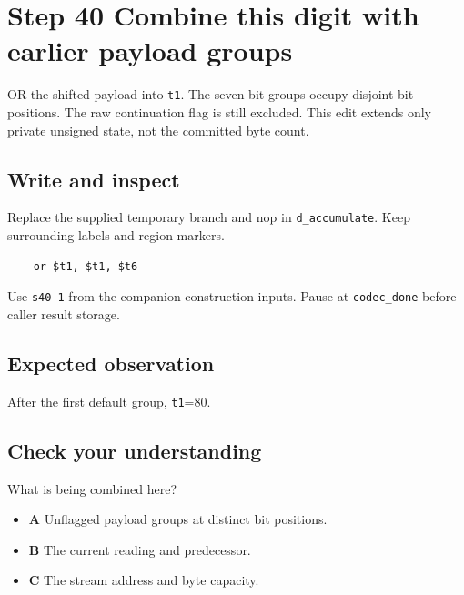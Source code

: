 \section{Step 40 Combine this digit with earlier payload groups}\label{delta-s40}

OR the shifted payload into \texttt{t1}. The seven-bit groups occupy disjoint bit positions. The raw continuation flag is still excluded. This edit extends only private unsigned state, not the committed byte count.

\subsection{Write and inspect}
Replace the supplied temporary branch and nop in \texttt{d\_accumulate}. Keep surrounding labels and region markers.

\begin{verbatim}
    or $t1, $t1, $t6
\end{verbatim}
Use \texttt{s40-1} from the companion construction inputs. Pause at \texttt{codec\_done} before caller result storage.

\subsection{Expected observation}
After the first default group, \texttt{t1}=80.

\subsection{Check your understanding}
What is being combined here?

\begin{itemize}
  \item \textbf{A} Unflagged payload groups at distinct bit positions.
  \item \textbf{B} The current reading and predecessor.
  \item \textbf{C} The stream address and byte capacity.
\end{itemize}
